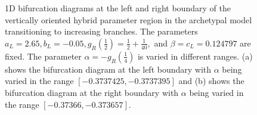 \begin{figure}
	\centering
	\caption[1D bifurcation diagrams at the left and right boundary of the vertically oriented hybrid parameter region in the archetypal model transitioning to increasing branches]{
		1D bifurcation diagrams at the left and right boundary of the vertically oriented hybrid parameter region in the archetypal model transitioning to increasing branches.
		The parameters $a_L = 2.65, b_L = -0.05, g_R\left(\frac{1}{2}\right) = \frac{1}{2} + \frac{1}{40},$ and $\beta = c_L = 0.124797$ are fixed.
		The parameter $\alpha = -g_R\left(\frac{1}{4}\right)$ is varied in different ranges.
		(a) shows the bifurcation diagram at the left boundary with $\alpha$ being varied in the range $[-0.3737425, -0.3737395]$
		and (b) shows the bifurcation diagram at the right boundary with $\alpha$ being varied in the range $[-0.37366, -0.373657]$.
	}
	\label{fig:add.appa.vert.bif}
\end{figure}
